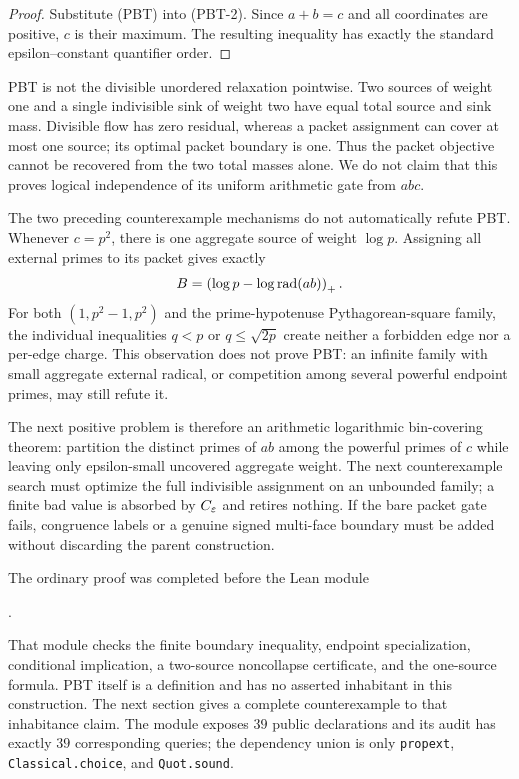 \begin{proof}
Substitute (PBT) into (PBT-2).  Since $a+b=c$ and all coordinates are
positive, $c$ is their maximum.  The resulting inequality has exactly the
standard epsilon--constant quantifier order.
\end{proof}

PBT is not the divisible unordered relaxation pointwise.  Two sources of
weight one and a single indivisible sink of weight two have equal total source
and sink mass.  Divisible flow has zero residual, whereas a packet assignment
can cover at most one source; its optimal packet boundary is one.  Thus the
packet objective cannot be recovered from the two total masses alone.  We do
not claim that this proves logical independence of its uniform arithmetic
gate from $abc$.

The two preceding counterexample mechanisms do not automatically refute PBT.
Whenever $c=p^2$, there is one aggregate source of weight $\log p$.  Assigning
all external primes to its packet gives exactly
\[
 B=\left(\log p-\log\operatorname{rad}(ab)\right)_+.
\]
For both $(1,p^2-1,p^2)$ and the prime-hypotenuse Pythagorean-square family,
the individual inequalities $q<p$ or $q\le\sqrt{2p}$ create neither a
forbidden edge nor a per-edge charge.  This observation does not prove PBT:
an infinite family with small aggregate external radical, or competition
among several powerful endpoint primes, may still refute it.

The next positive problem is therefore an arithmetic logarithmic bin-covering
theorem: partition the distinct primes of $ab$ among the powerful primes of
$c$ while leaving only epsilon-small uncovered aggregate weight.  The next
counterexample search must optimize the full indivisible assignment on an
unbounded family; a finite bad value is absorbed by $C_\varepsilon$ and retires
nothing.  If the bare packet gate fails, congruence labels or a genuine signed
multi-face boundary must be added without discarding the parent construction.

The ordinary proof was completed before the Lean module
\begin{center}
.
\end{center}
That module checks the finite boundary inequality, endpoint specialization,
conditional implication, a two-source noncollapse certificate, and the
one-source formula.  PBT itself is a definition and has no asserted
inhabitant in this construction.  The next section gives a complete
counterexample to that inhabitance claim.  The module exposes $39$ public declarations and its audit has
exactly $39$ corresponding queries; the dependency union is only
\texttt{propext}, \texttt{Classical.choice}, and \texttt{Quot.sound}.
